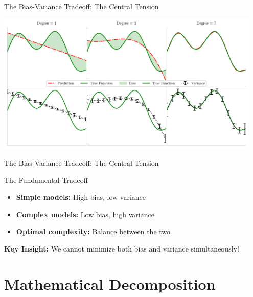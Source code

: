 \documentclass[10pt]{beamer}
\newcommand{\fitpic}[1]{\begin{adjustbox}{max width=\linewidth, max totalheight=0.78\textheight}#1\end{adjustbox}}
\begin{document}
\begin{frame}{The Bias-Variance Tradeoff: The Central Tension}
\begin{center}
\fitpic{\includegraphics[width=0.95\textwidth]{../assets/bias-variance/figures/bv-2.pdf}}
\end{center}
\end{frame}
\begin{frame}{The Bias-Variance Tradeoff: The Central Tension}
\begin{alertbox}{The Fundamental Tradeoff}
\begin{itemize}
\item \textbf{Simple models:} High bias, low variance
\item \textbf{Complex models:} Low bias, high variance
\item \textbf{Optimal complexity:} Balance between the two
\end{itemize}
\end{alertbox}

\begin{keypointsbox}
\textbf{Key Insight:} We cannot minimize both bias and variance simultaneously!
\end{keypointsbox}
\end{frame}


\section{Mathematical Decomposition}
\end{document}
